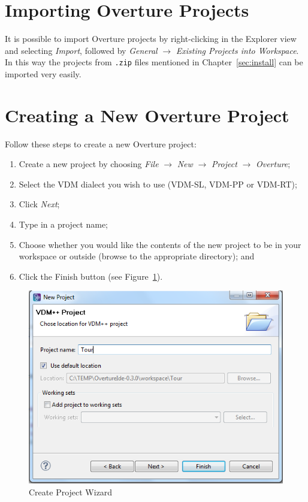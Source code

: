 \documentclass{overturerepchap}
\begin{document}
\section{Importing Overture Projects}\label{subsec:importproj}

It is possible to import Overture projects by
right-clicking in the Explorer view and selecting \emph{Import}, followed
by \emph{General} $\rightarrow$ \emph{Existing Projects into
  Workspace}.  In this way the projects from \texttt{.zip} files
mentioned in Chapter~\ref{sec:install} can be imported very
easily.  

\section{Creating a New Overture Project}

Follow these steps to create a new Overture project:

\begin{enumerate}
	\item Create a new project by choosing \emph{File}
          $\rightarrow$ \emph{New} $\rightarrow$ \emph{Project}
          $\rightarrow$ \emph{Overture}; 
	\item Select the VDM dialect you wish to use (VDM-SL, VDM-PP
          or VDM-RT);
	\item Click \emph{Next};
         \item Type in a project name;
	\item Choose whether you would like the contents of the new
          project to be in your workspace or outside
          (browse to the appropriate directory); and
    \item Click	the Finish button (see Figure~\ref{fig:CreateProjectWizard}).
\end{enumerate}

\begin{figure}[!htb]
	\begin{center}
	  \includegraphics[scale=0.8]{figures/CreateProjectWizard}
	  \caption[Create Project Wizard]{Create Project Wizard}
	  \label{fig:CreateProjectWizard}
	\end{center}
\end{figure}
\end{document}
